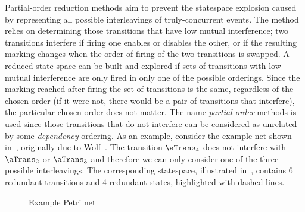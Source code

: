 Partial-order reduction methods aim to prevent the statespace explosion caused
by representing all possible interleavings of truly-concurrent events. The
method relies on determining those transitions that have low mutual
interference; two transitions interfere if firing one enables or disables the
other, or if the resulting marking changes when the order of firing of the two
transitions is swapped. A reduced state space can be built and explored if sets
of transitions with low mutual interference are only fired in only one of the
possible orderings. Since the marking reached after firing the set of
transitions is the same, regardless of the chosen order (if it were not, there
would be a pair of transitions that interfere), the particular chosen order
does not matter. The name \emph{partial-order} methods is used since those
transitions that do not interfere can be considered as unrelated by some
\emph{dependency} ordering.  As an example, consider the example net shown
in~, originally due to Wolf~\cite{Wolf2014}. The
transition $\aTrans_4$ does not interfere with $\aTrans_2$ or $\aTrans_3$ and
therefore we can only consider one of the three possible interleavings. The
corresponding statespace, illustrated in~,
contains 6 redundant transitions and 4 redundant states, highlighted with
dashed lines.

\begin{figure}[ht]
\centering
{}
\caption{Example Petri net}
\label{fig:lowInterferenceNet}
\end{figure}

